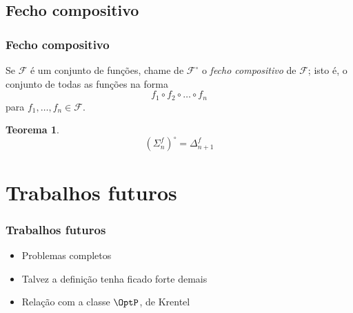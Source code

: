 \documentclass[utf8,notheorems]{beamer}
\newtheorem*{theorem}{Teorema}
\theoremstyle{definition}
\begin{document}
\subsection{Fecho compositivo}
\begin{frame}
    \frametitle{Fecho compositivo}

    Se $\mathcal F$ é um conjunto de funções,
    chame de $\mathcal F^\circ$
    o \emph{fecho compositivo} de $\mathcal F$;
    isto é, o conjunto de todas as funções na forma
    \begin{equation*}
        f_1 \circ f_2 \circ \dots \circ f_n
    \end{equation*}
    para $f_1, \dots, f_n \in \mathcal F$.

    \begin{theorem}
        \begin{equation*}
            (\Sigma_n^f)^\circ = \Delta_{n+1}^f
        \end{equation*}
    \end{theorem}
\end{frame}

\section{Trabalhos futuros}
\begin{frame}
    \frametitle{Trabalhos futuros}
    \begin{itemize}
        \item Problemas completos
        \item Talvez a definição tenha ficado forte demais
        \item Relação com a classe $\OptP$, de Krentel
    \end{itemize}
\end{frame}
\end{document}
